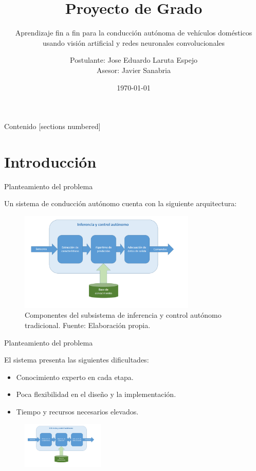 \documentclass[10pt]{beamer}
\title{Proyecto de Grado}
\subtitle{Aprendizaje fin a fin para la conducción autónoma de vehículos domésticos usando visión artificial y redes neuronales convolucionales}
\date{\today}
\author{Postulante: Jose Eduardo Laruta Espejo \\ 
        Asesor: Javier Sanabria}
\institute{Universidad Mayor de San Andrés}
\begin{document}
\maketitle

\begin{frame}{Contenido}
  [sections numbered]
  \tableofcontents[hideallsubsections]
\end{frame}

\section{Introducción}


\begin{frame}[fragile]{Planteamiento del problema}

  Un sistema de conducción autónomo cuenta con la siguiente arquitectura:
  \begin{figure}[!h] 
    \centering
    \includegraphics[width=0.75\textwidth]{../img/inferencia}
    \caption[Inferencia y control autónomo tradicional]{Componentes del subsistema de inferencia y control autónomo tradicional. Fuente: Elaboración propia.}
\end{figure}

\end{frame}

\begin{frame}[fragile]{Planteamiento del problema}

    El sistema presenta las siguientes dificultades:
    \begin{itemize}
        \item Conocimiento experto en cada etapa.
        \item Poca flexibilidad en el diseño y la implementación.
        \item Tiempo y recursos necesarios elevados.
    \end{itemize}
    \begin{figure}[!h] 
      \centering
      \includegraphics[width=0.35\textwidth]{../img/inferencia}
      \end{figure}
  
  \end{frame}
\end{document}
